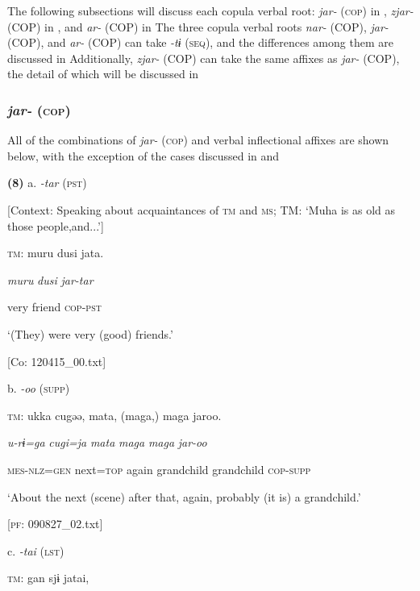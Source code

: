 The following subsections will discuss each copula verbal root: \textit{jar-} (\textsc{cop}) in , \textit{zjar-} (COP) in , and \textit{ar-} (COP) in  The three copula verbal roots \textit{nar-} (COP), \textit{jar-} (COP), and \textit{ar-} (COP) can take \textit{{}-tɨ} (\textsc{seq}), and the differences among them are discussed in  Additionally, \textit{zjar-} (COP) can take the same affixes as \textit{jar-} (COP), the detail of which will be discussed in 

\subsubsection{\textit{jar-} (\textsc{cop})}

All of the combinations of \textit{jar-} (\textsc{cop}) and verbal inflectional affixes are shown below, with the exception of the cases discussed in  and 

\textbf{(8)}  a.  \textit{{}-tar} (\textsc{pst})

    [Context: Speaking about acquaintances of \textsc{tm} and \textsc{ms}; TM: ‘Muha is as old as those people,and...’]

    \textsc{tm}:  muru  dusi  jata.

      \textit{muru}  \textit{dusi}  \textit{jar-tar}

      very  friend  \textsc{cop}-\textsc{pst}

      ‘(They) were very (good) friends.’

      [Co: 120415\_00.txt]

  b.  \textit{{}-oo} (\textsc{supp})

    \textsc{tm}:  ukka  cugəə,  mata,  (maga,)  maga  jaroo.

      \textit{u-rɨ=ga}  \textit{cugi=ja}  \textit{mata}  \textit{maga}  \textit{maga}  \textit{jar-oo}

      \textsc{mes}-\textsc{nlz}=\textsc{gen}  next=\textsc{top}  again  grandchild  grandchild  \textsc{cop}-\textsc{supp}

      ‘About the next (scene) after that, again, probably (it is) a grandchild.’

      [\textsc{pf}: 090827\_02.txt]

  c.  \textit{{}-tai} (\textsc{lst})

    \textsc{tm}:  gan  sjɨ  jatai,

